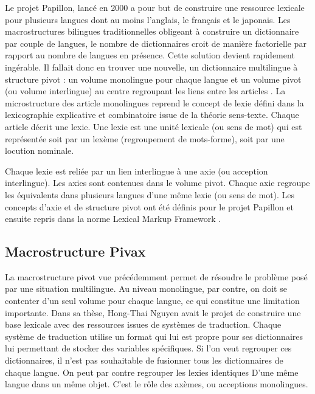 \documentclass[10pt,a4paper,twoside]{article}
\begin{document}
Le projet Papillon, lancé en 2000 \cite{MTMMEP00} a pour but de construire une ressource lexicale pour plusieurs langues dont au moins l'anglais, le français et le japonais. Les macrostructures bilingues traditionnelles obligeant à construire un dictionnaire par couple de langues, le nombre de dictionnaires croit de manière factorielle par rapport au nombre de langues en présence. Cette solution devient rapidement ingérable. Il fallait donc en trouver une nouvelle, un dictionnaire multilingue à structure pivot : un volume monolingue pour chaque langue et un volume pivot (ou volume interlingue) au centre regroupant les liens entre les articles \cite{GSMM01a}. La microstructure des article monolingues reprend le concept de lexie défini dans la lexicographie explicative et combinatoire \cite{MelcukClasPolguere95} issue de la théorie sens-texte. Chaque article décrit une lexie. Une lexie est une unité lexicale (ou sens de mot) qui est représentée soit par un lexème (regroupement de mots-forme), soit par une locution nominale.

Chaque lexie est reliée par un lien interlingue à une axie (ou acception interlingue). Les axies sont contenues dans le volume pivot. Chaque axie regroupe les équivalents dans plusieurs langues d'une même lexie (ou sens de mot).
Les concepts d'axie et de structure pivot ont été définis pour le projet Papillon et ensuite repris dans la norme Lexical Markup Framework \cite{Francopoulo09}.


\subsection{Macrostructure Pivax}

La macrostructure pivot vue précédemment permet de résoudre le problème posé par une situation multilingue. Au niveau monolingue, par contre, on doit se contenter d'un seul volume pour chaque langue, ce qui constitue une limitation importante. Dans sa thèse, Hong-Thai Nguyen \cite{HTN09} avait le projet de construire une base lexicale avec des ressources issues de systèmes de traduction. Chaque système de traduction utilise un format qui lui est propre pour ses dictionnaires lui permettant de stocker des variables spécifiques. Si l'on veut regrouper ces dictionnaires, il n'est pas souhaitable de fusionner tous les dictionnaires de chaque langue. On peut par contre regrouper les lexies identiques D'une même langue dans un même objet. C'est le rôle des axèmes, ou acceptions monolingues.
\end{document}
